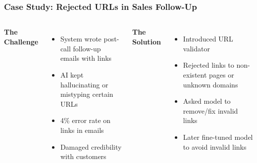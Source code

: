 \begin{frame}
    \frametitle{Case Study: Rejected URLs in Sales Follow-Up}
    
    \begin{columns}
        \textbf{The Challenge}
        \begin{itemize}
            \item System wrote post-call follow-up emails with links
            \item AI kept hallucinating or mistyping certain URLs
            \item 4\% error rate on links in emails
            \item Damaged credibility with customers
        \end{itemize}
        
        \textbf{The Solution}
        \begin{itemize}
            \item Introduced URL validator
            \item Rejected links to non-existent pages or unknown domains
            \item Asked model to remove/fix invalid links
            \item Later fine-tuned model to avoid invalid links
        \end{itemize}
    \end{columns}
    
    \vspace{0.3cm}
    \begin{center}
    \end{center}
\end{frame}

